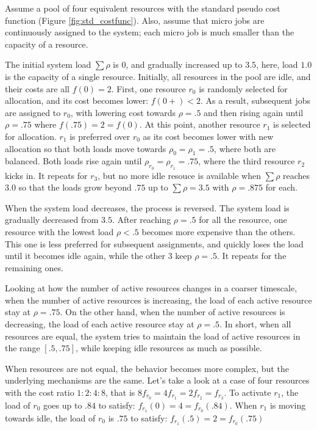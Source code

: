 Assume a pool of four equivalent resources with the standard pseudo cost
function (Figure \ref{fig:std_costfunc}).
Also, assume that micro jobs are continuously assigned to the
system; each micro job is much smaller than the capacity of a
resource.

The initial system load $\sum \rho$ is $0$, and gradually increased
up to $3.5$, here, load $1.0$ is the capacity of a single resource.
Initially, all resources in the pool are idle, and their costs are
all $f(0)= 2$.
First, one resource $r_{0}$ is randomly selected for allocation, and its
cost becomes lower: $f(0+) < 2$. As a result, subsequent jobs are
assigned to $r_{0}$, with lowering cost towards $\rho = .5$ and then
rising again until $\rho = .75$ where $f(.75) = 2 = f(0)$.
At this point, another resource $r_{1}$ is selected for allocation.
$r_{1}$ is preferred over $r_{0}$ as its cost becomes lower with new
allocation so that both loads move towards $\rho_{0} = \rho_{1} = .5$,
where both are balanced.
Both loads rise again until $\rho_{r_{0}} = \rho_{r_{1}} = .75$,
where the third resource $r_{2}$ kicks in.
It repeats for $r_{3}$, but no more idle resouce is available
when $\sum \rho$ reaches $3.0$ so that the loads grow beyond $.75$
up to $\sum \rho = 3.5$ with $\rho = .875$ for each.

When the system load decreases, the process is reversed.
The system load is gradually decreased from $3.5$.
After reaching $\rho = .5$ for all the resource,
one resource with the lowest load $\rho < .5$ becomes more expensive
than the others.
This one is less preferred for subsequent assignments, and quickly
loses the load until it becomes idle again, while the other 3 keep
$\rho = .5$. It repeats for the remaining ones.

Looking at how the number of active resources changes in a coarser
timescale,
when the number of active resources is increasing, the load of each
active resource stay at $\rho = .75$.
On the other hand, when the number of active resources is decreasing,
the load of each active resource stay at $\rho = .5$.
In short, when all resources are equal, the system tries to maintain
the load of active resources in the range $[.5, .75]$, while keeping
idle resources as much as possible.

When resources are not equal, the behavior becomes more complex, but
the underlying mechanisms are the same.
Let's take a look at a case of four resources with the cost ratio $1:2:4:8$,
that is $8 f_{r_{0}} = 4 f_{r_{1}} = 2 f_{r_{2}} = f_{r_{3}}$.
To activate $r_{1}$, the load of $r_{0}$ goes up to $.84$ to satisfy:
$f_{r_{1}}(0) = 4 = f_{r_{0}}(.84)$.
When $r_{1}$ is moving towards idle, the load of $r_{0}$ is $.75$ to
satisfy: $f_{r_{1}}(.5) = 2 = f_{r_{0}}(.75)$

